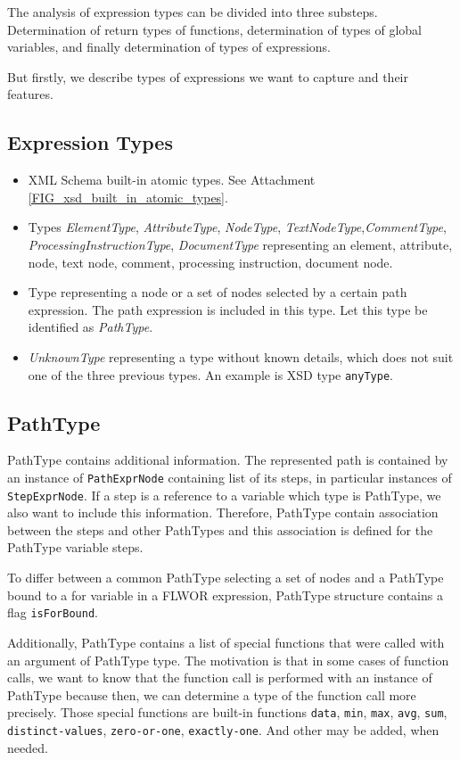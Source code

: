 The analysis of expression types can be divided into three substeps. Determination of return types of functions, determination of types of global variables, and finally determination of types of expressions.

But firstly, we describe types of expressions we want to capture and their features.

\subsection{Expression Types}
\begin{itemize}
\item XML Schema built-in atomic types. See Attachment \ref{FIG_xsd_built_in_atomic_types}.
\item Types \emph{ElementType}, \emph{AttributeType}, \emph{NodeType}, \emph{TextNodeType},\linebreak \emph{CommentType}, \emph{ProcessingInstructionType}, \emph{DocumentType} representing an element, attribute, node, text node, comment, processing instruction, document node.
\item Type representing a node or a set of nodes selected by a certain path expression. The path expression is included in this type. Let this type be identified as \emph{PathType}.
\item \emph{UnknownType} representing a type without known details, which does not suit one of the three previous types. An example is XSD type \texttt{anyType}.
\end{itemize}

\subsection{PathType}
PathType contains additional information. The represented path is contained by an instance of \texttt{PathExprNode} containing list of its steps, in particular instances of \texttt{StepExprNode}. If a step is a reference to a variable which type is PathType, we also want to include this information. Therefore, PathType contain association between the steps and other PathTypes and this association is defined for the PathType variable steps.

To differ between a common PathType selecting a set of nodes and a PathType bound to a for variable in a FLWOR expression, PathType structure contains a flag \texttt{isForBound}.

Additionally, PathType contains a list of special functions that were called with an argument of PathType type. The motivation is that in some cases of function calls, we want to know that the function call is performed with an instance of PathType because then, we can determine a type of the function call more precisely. Those special functions are built-in functions \texttt{data}, \texttt{min}, \texttt{max}, \texttt{avg}, \texttt{sum}, \texttt{distinct-values}, \texttt{zero-or-one}, \texttt{exactly-one}. And other may be added, when needed.


